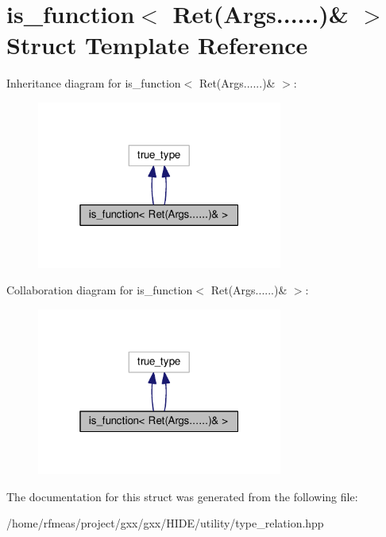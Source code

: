 \hypertarget{structis__function_3_01Ret_07Args_8_8_8_8_8_8_08_6_01_4}{}\section{is\+\_\+function$<$ Ret(Args......)\& $>$ Struct Template Reference}
\label{structis__function_3_01Ret_07Args_8_8_8_8_8_8_08_6_01_4}


Inheritance diagram for is\+\_\+function$<$ Ret(Args......)\& $>$\+:
\nopagebreak
\begin{figure}[H]
\begin{center}
\leavevmode
\includegraphics[width=229pt]{structis__function_3_01Ret_07Args_8_8_8_8_8_8_08_6_01_4__inherit__graph}
\end{center}
\end{figure}


Collaboration diagram for is\+\_\+function$<$ Ret(Args......)\& $>$\+:
\nopagebreak
\begin{figure}[H]
\begin{center}
\leavevmode
\includegraphics[width=229pt]{structis__function_3_01Ret_07Args_8_8_8_8_8_8_08_6_01_4__coll__graph}
\end{center}
\end{figure}


The documentation for this struct was generated from the following file\+:\begin{DoxyCompactItemize}
\item 
/home/rfmeas/project/gxx/gxx/\+H\+I\+D\+E/utility/type\+\_\+relation.\+hpp\end{DoxyCompactItemize}
